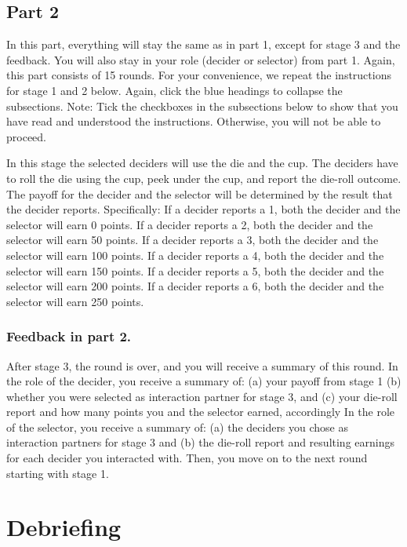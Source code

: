 \documentclass[man]{apa6}
\begin{document}
\hypertarget{part-2}{%
\subsection{Part 2}\label{part-2}}

In this part, everything will stay the same as in part 1, except for
stage 3 and the feedback. You will also stay in your role (decider or
selector) from part 1. Again, this part consists of 15 rounds. For your
convenience, we repeat the instructions for stage 1 and 2 below. Again,
click the blue headings to collapse the subsections. Note: Tick the
checkboxes in the subsections below to show that you have read and
understood the instructions. Otherwise, you will not be able to proceed.

In this stage the selected deciders will use the die and the cup. The
deciders have to roll the die using the cup, peek under the cup, and
report the die-roll outcome. The payoff for the decider and the selector
will be determined by the result that the decider reports. Specifically:
If a decider reports a 1, both the decider and the selector will earn 0
points. If a decider reports a 2, both the decider and the selector will
earn 50 points. If a decider reports a 3, both the decider and the
selector will earn 100 points. If a decider reports a 4, both the
decider and the selector will earn 150 points. If a decider reports a 5,
both the decider and the selector will earn 200 points. If a decider
reports a 6, both the decider and the selector will earn 250 points.

\hypertarget{feedback-in-part-2.}{%
\subsubsection{Feedback in part 2.}\label{feedback-in-part-2.}}

After stage 3, the round is over, and you will receive a summary of this
round. In the role of the decider, you receive a summary of: (a) your
payoff from stage 1 (b) whether you were selected as interaction partner
for stage 3, and (c) your die-roll report and how many points you and
the selector earned, accordingly In the role of the selector, you
receive a summary of: (a) the deciders you chose as interaction partners
for stage 3 and (b) the die-roll report and resulting earnings for each
decider you interacted with. Then, you move on to the next round
starting with stage 1.

\hypertarget{debriefing-1}{%
\section{Debriefing}\label{debriefing-1}}
\end{document}
